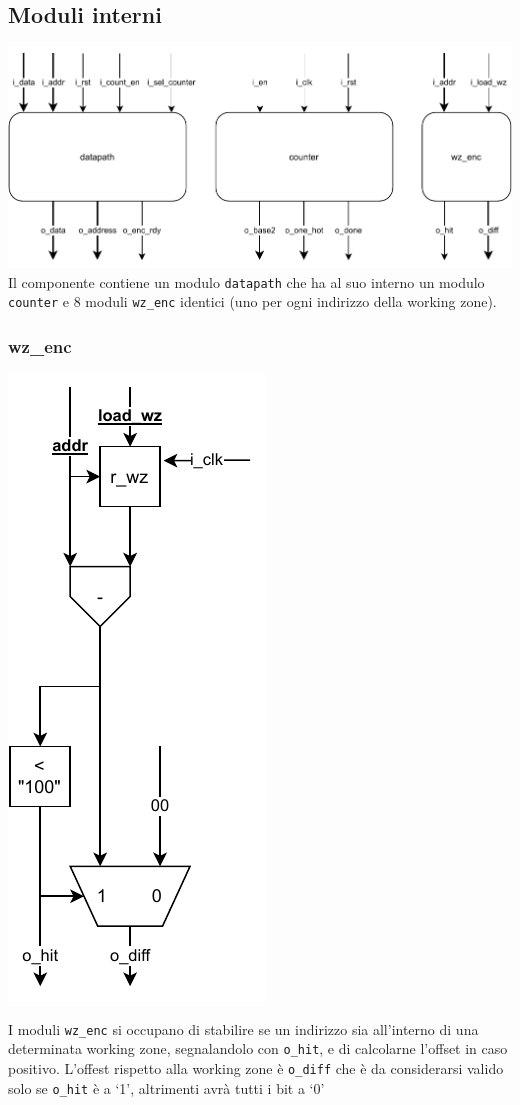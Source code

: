 \documentclass[a4paper,twocolumn]{article}
\begin{document}
\subsection{Moduli interni}
\includegraphics[width=\linewidth]{schema-components.pdf}
Il componente contiene un modulo \texttt{datapath} che ha al suo interno un modulo \texttt{counter} e 8 moduli \texttt{wz\_enc} identici (uno per ogni indirizzo della working zone).

\subsubsection{wz\_enc}
\includegraphics[height=\linewidth]{schema-wz_enc.pdf}

I moduli \texttt{wz\_enc} si occupano di stabilire se un indirizzo sia all'interno di una determinata working zone, segnalandolo con \texttt{o\_hit}, e di calcolarne l'offset in caso positivo. L'offest rispetto alla working zone è \texttt{o\_diff} che è da considerarsi valido solo se \texttt{o\_hit} è a `1', altrimenti avrà tutti i bit a `0'
\end{document}
